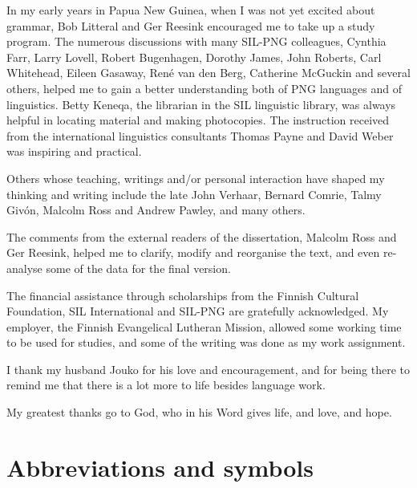 In my early years in Papua New Guinea, when I was not yet excited about grammar,  Bob Litteral and Ger Reesink encouraged me to take up a study program. The numerous discussions with many SIL-PNG colleagues, Cynthia Farr, Larry Lovell, Robert Bugenhagen, Dorothy James, John Roberts, Carl Whitehead, Eileen Gasaway, Ren\'e van den Berg, Catherine McGuckin and several others, helped me to gain a better understanding both of  PNG languages and of linguistics. Betty Keneqa, the librarian in the SIL linguistic library, was always helpful in locating material and making photocopies. The instruction received from the international linguistics consultants Thomas Payne and David Weber was inspiring and practical.

Others whose teaching, writings and/or personal interaction have shaped my thinking and writing include the late John Verhaar, Bernard Comrie, Talmy Giv\'on, Malcolm Ross and Andrew Pawley, and many others.  

The comments from the external readers of the dissertation, Malcolm Ross and Ger Reesink, helped me to clarify, modify and reorganise the text, and even re-analyse some of the data for the final version.

The financial assistance through scholarships from the Finnish Cultural Foundation, SIL International and SIL-PNG are gratefully acknowledged. My employer, the Finnish Evangelical Lutheran Mission, allowed some working time to be used for studies, and some of the writing was done as my work assignment. 

I thank my husband Jouko for his love and encouragement, and for being there to remind me that there is a lot more to life besides language work.

My greatest thanks go to God, who in his Word gives life, and love, and hope. 



\section*{Abbreviations and symbols}

